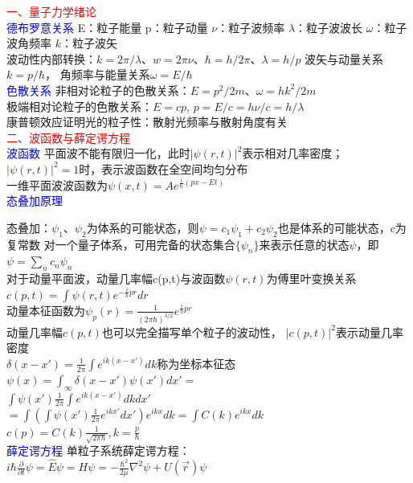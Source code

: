 \documentclass[a4paper,8pt]{extarticle} %
\newcommand{\bluetext}[1]{\textcolor{blue}{#1}}
\newcommand{\redtext}[1]{\textcolor{red}{#1}}
\begin{document}
\begin{multicols}{3}

\redtext{一、量子力学绪论}\\
\bluetext{德布罗意关系}
E：粒子能量 p：粒子动量 $\nu$：粒子波频率 $\lambda$：粒子波波长 $\omega$：粒子波角频率 $k$：粒子波矢\\
波动性内部转换：$k=2\pi/\lambda$、$w=2\pi\nu$、$\hbar=h/2\pi$、$\lambda=h/p$
波矢与动量关系$k=p/\hbar$，
角频率与能量关系$\omega=E/\hbar$ \\
\bluetext{色散关系}
非相对论粒子的色散关系：$E = p^2/2m$、$\omega=hk^2/2m$ \\
极端相对论粒子的色散关系：$E = cp$,
$p=E/c=h\nu/c=h/\lambda$\\
康普顿效应证明光的粒子性：散射光频率与散射角度有关\\
\redtext{二、波函数与薛定谔方程}\\
\bluetext{波函数}
平面波不能有限归一化，此时$|\psi(r, t)|^2$表示相对几率密度；$|\psi(r, t)|^2 = 1$时，表示波函数在全空间均匀分布\\
一维平面波波函数为$\psi(x, t) = Ae^{\frac{i}{\hbar}(px-E t)}$\\
\bluetext{态叠加原理}

态叠加：$\psi_1、\psi_2$为体系的可能状态，则$\psi=c_1\psi_1+c_2\psi_2$也是体系的可能状态，c为复常数
对一个量子体系，可用完备的状态集合${\{\psi_n\}}$来表示任意的状态$\psi$，即$\psi=\sum_n c_n\psi_n$\\
对于动量平面波，动量几率幅c(p,t)与波函数$\psi(r,t)$为傅里叶变换关系$c(p,t)=\int\psi(r,t)e^{-\frac{i}{\hbar}pr}dr$\\
动量本征函数为$\psi_p(r)=\frac{1}{(2\pi\hbar)^{3/2}}e^{\frac{i}{\hbar}pr}$\\
动量几率幅$c(p,t)$也可以完全描写单个粒子的波动性， $|c(p,t)|^2$表示动量几率密度\\
$\delta(x-x')=\frac{1}{2\pi}\int e^{ik(x-x')}dk$称为坐标本征态\\
$\psi(x)=\int_\infty\delta(x-x')\psi(x')dx'= $ \\ $\int\psi(x')\frac{1}{2\pi}\int e^{ik(x-x')}dkdx'$\\
$ = \int(\int\psi(x')\frac{1}{2\pi}e^{ikx'}dx')e^{ikx}dk=\int C(k)e^{ikx}dk $\\
$c(p)=C(k)\frac{1}{\sqrt{2\pi\hbar}}, k=\frac{p}{\hbar}$\\
\bluetext{薛定谔方程}
单粒子系统薛定谔方程：\\$i\hbar\frac{\partial}{\partial t}\psi = \hat{E}\psi = H\psi = -\frac{\hbar^2}{2\mu}\nabla^2\psi + U(\vec{r})\psi$ 
 

\end{multicols}
\end{document}
